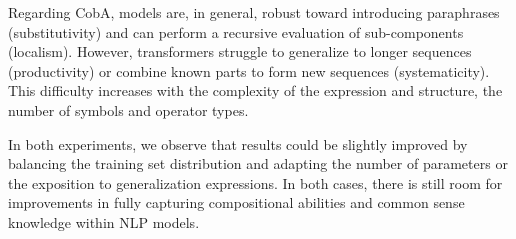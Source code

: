 Regarding CobA, models are, in general, robust toward introducing paraphrases (substitutivity) and can perform a recursive evaluation of sub-components (localism). However, transformers struggle to generalize to longer sequences (productivity) or combine known parts to form new sequences (systematicity). This difficulty increases with the complexity of the expression and structure, the number of symbols and operator types. 

In both experiments, we observe that results could be slightly improved by balancing the training set distribution and adapting the number of parameters or the exposition to generalization expressions. In both cases, there is still room for improvements in fully capturing compositional abilities and common sense knowledge within NLP models.
